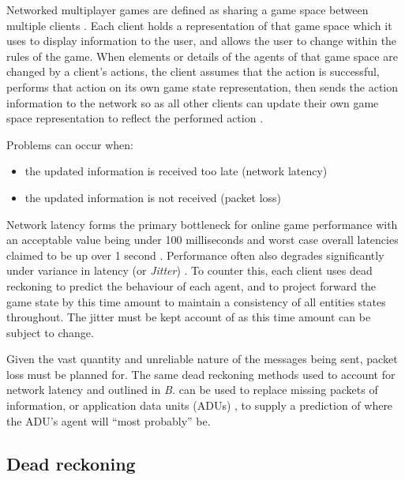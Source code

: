 \documentclass[journal]{IEEEtran}
\begin{document}
Networked multiplayer games are defined as sharing a game space between multiple clients \cite{diot1999distributed}. Each client holds a representation of that game space which it uses to display information to the user, and allows the user to change within the rules of the game. When elements or details of the agents of that game space are changed by a client's actions, the client assumes that the action is successful, performs that action on its own game state representation, then sends the action information to the network so as all other clients can update their own game space representation to reflect the performed action \cite{bernier2001latency}.

Problems can occur when:
\begin{itemize}
    \item the updated information is received too late (network latency)
    \item the updated information is not received (packet loss)
\end{itemize}

Network latency forms the primary bottleneck for online game performance with an acceptable value being under 100 milliseconds \cite{smed2002aspects} and worst case overall latencies claimed to be up over 1 second \cite{claypool2006latency}. Performance often also degrades significantly under variance in latency (or \textit{Jitter}) \cite{beigbeder2004effects} \cite{dick2005analysis}. To counter this, each client uses dead reckoning to predict the behaviour of each agent, and to project forward the game state by this time amount to maintain a consistency of all entities states throughout.
The jitter must be kept account of as this time amount can be subject to change.

Given the vast quantity and unreliable nature \cite{cronin2001distributed} of the messages being sent, packet loss must be planned for. The same dead reckoning methods used to account for network latency and outlined in \textit{B.} can be used to replace missing packets of information, or application data units (ADUs) \cite{diot1999distributed}, to supply a prediction of where the ADU's agent will ``most probably'' be.

\subsection{Dead reckoning}
\end{document}
